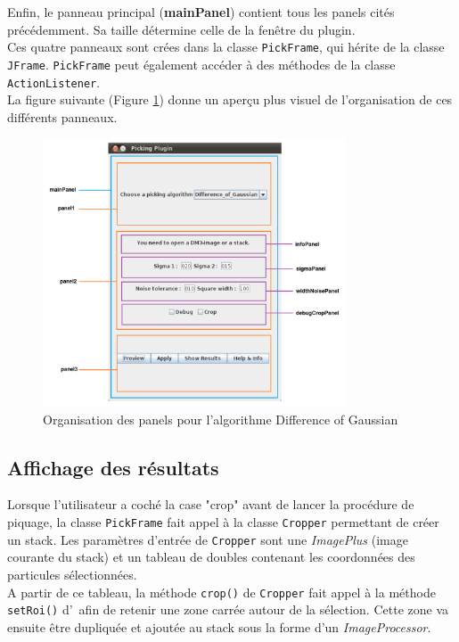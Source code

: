 Enfin, le panneau principal (\textbf{mainPanel}) contient tous les panels cités précédemment. Sa taille détermine celle de la fenêtre du plugin. \\
Ces quatre panneaux sont crées dans la classe \texttt{PickFrame}, qui hérite de la classe \texttt{JFrame}. \texttt{PickFrame} peut également accéder à des méthodes de la classe \texttt{ActionListener}. \\

La figure suivante (Figure \ref{panneauxDetail}) donne un aperçu plus visuel de l'organisation de ces différents panneaux.
\begin{figure}[!h] 
\begin{center}
\includegraphics[width=0.8\textwidth]{plugin3-1.png}
\caption{Organisation des panels pour l'algorithme Difference of Gaussian}
\label{panneauxDetail}
\end{center}
\end{figure}
\pagebreak

\subsection{Affichage des résultats}

Lorsque l'utilisateur a coché la case "crop" avant de lancer la procédure de piquage, la classe \texttt{PickFrame} fait appel à la classe \texttt{Cropper} permettant de créer un stack. Les paramètres d'entrée de \texttt{Cropper} sont une \emph{ImagePlus} (image courante du stack) et un tableau de doubles contenant les coordonnées des particules sélectionnées. \\
A partir de ce tableau, la méthode \texttt{crop()} de \texttt{Cropper} fait appel à la méthode \texttt{setRoi()} d'\imj ~afin de retenir une zone carrée autour de la sélection. Cette zone va ensuite être dupliquée et ajoutée au stack sous la forme d'un \emph{ImageProcessor}. \\

